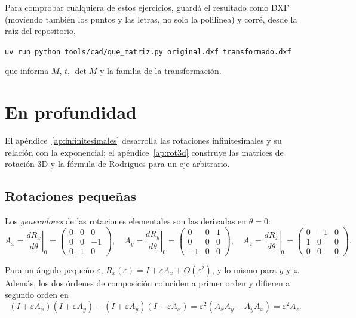 Para comprobar cualquiera de estos ejercicios, guardá el resultado como DXF (moviendo también
los puntos y las letras, no solo la polilínea) y corré, desde la raíz del repositorio,
\begin{center}\small
\texttt{uv run python tools/cad/que\_matriz.py original.dxf transformado.dxf}
\end{center}
que informa \(M\), \(t\), \(\det M\) y la familia de la transformación.

\section{En profundidad}

El apéndice~\ref{ap:infinitesimales} desarrolla las rotaciones infinitesimales y su relación
con la exponencial; el apéndice~\ref{ap:rot3d} construye las matrices de rotación 3D y la
fórmula de Rodrigues para un eje arbitrario.

\subsection{Rotaciones pequeñas}

\begin{definicion}
Los \emph{generadores} de las rotaciones elementales son las derivadas en \(\theta=0\):
\[
A_x=\left.\frac{dR_x}{d\theta}\right|_{0}=
\begin{pmatrix}0&0&0\\0&0&-1\\0&1&0\end{pmatrix},\quad
A_y=\left.\frac{dR_y}{d\theta}\right|_{0}=
\begin{pmatrix}0&0&1\\0&0&0\\-1&0&0\end{pmatrix},\quad
A_z=\left.\frac{dR_z}{d\theta}\right|_{0}=
\begin{pmatrix}0&-1&0\\1&0&0\\0&0&0\end{pmatrix}.
\]
\end{definicion}

\begin{proposicion}\label{prop:rot-pequenas}
Para un ángulo pequeño \(\varepsilon\),
\(R_x(\varepsilon)=I+\varepsilon A_x+O(\varepsilon^2)\), y lo mismo para \(y\) y \(z\).
Además, los dos órdenes de composición coinciden a primer orden y difieren a segundo orden en
\[
(I+\varepsilon A_x)(I+\varepsilon A_y)-(I+\varepsilon A_y)(I+\varepsilon A_x)
=\varepsilon^2(A_xA_y-A_yA_x)=\varepsilon^2A_z.
\]
\end{proposicion}

